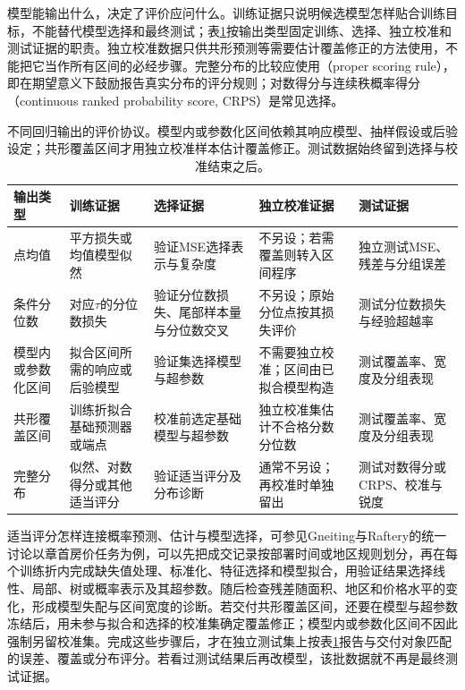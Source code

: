 模型能输出什么，决定了评价应问什么。训练证据只说明候选模型怎样贴合训练目标，不能替代模型选择和最终测试；表\ref{tab:regression-evaluation-protocol}按输出类型固定训练、选择、独立校准和测试证据的职责。独立校准数据只供共形预测等需要估计覆盖修正的方法使用，不能把它当作所有区间的必经步骤。完整分布的比较应使用（proper scoring rule），即在期望意义下鼓励报告真实分布的评分规则；对数得分与连续秩概率得分（continuous ranked probability score, CRPS）是常见选择。

\begin{table}[htbp]
  \centering
  \small
  \begin{tabularx}{\linewidth}{@{}>{\RaggedRight\arraybackslash}p{20mm}>{\RaggedRight\arraybackslash}X>{\RaggedRight\arraybackslash}X>{\RaggedRight\arraybackslash}X>{\RaggedRight\arraybackslash}X@{}}
    \toprule
    输出类型 & 训练证据 & 选择证据 & 独立校准证据 & 测试证据 \\
    \midrule
    点均值 & 平方损失或均值模型似然 & 验证MSE选择表示与复杂度 & 不另设；若需覆盖则转入区间程序 & 独立测试MSE、残差与分组误差 \\
    条件分位数 & 对应$\tau$的分位数损失 & 验证分位数损失、尾部样本量与分位数交叉 & 不另设；原始分位点按其损失评价 & 测试分位数损失与经验超越率 \\
    模型内或参数化区间 & 拟合区间所需的响应或后验模型 & 验证集选择模型与超参数 & 不需要独立校准；区间由已拟合模型构造 & 测试覆盖率、宽度及分组表现 \\
    共形覆盖区间 & 训练折拟合基础预测器或端点 & 校准前选定基础模型与超参数 & 独立校准集估计不合格分数分位数 & 测试覆盖率、宽度及分组表现 \\
    完整分布 & 似然、对数得分或其他适当评分 & 验证适当评分及分布诊断 & 通常不另设；再校准时单独留出 & 测试对数得分或CRPS、校准与锐度 \\
    \bottomrule
  \end{tabularx}
  \caption{不同回归输出的评价协议。模型内或参数化区间依赖其响应模型、抽样假设或后验设定；共形覆盖区间才用独立校准样本估计覆盖修正。测试数据始终留到选择与校准结束之后。}
  \label{tab:regression-evaluation-protocol}
\end{table}

适当评分怎样连接概率预测、估计与模型选择，可参见Gneiting与Raftery的统一讨论以章首房价任务为例，可以先把成交记录按部署时间或地区规则划分，再在每个训练折内完成缺失值处理、标准化、特征选择和模型拟合，用验证结果选择线性、局部、树或概率表示及其超参数。随后检查残差随面积、地区和价格水平的变化，形成模型失配与区间宽度的诊断。若交付共形覆盖区间，还要在模型与超参数冻结后，用未参与拟合和选择的校准集确定覆盖修正；模型内或参数化区间不因此强制另留校准集。完成这些步骤后，才在独立测试集上按表\ref{tab:regression-evaluation-protocol}报告与交付对象匹配的误差、覆盖或分布评分。若看过测试结果后再改模型，该批数据就不再是最终测试证据。

